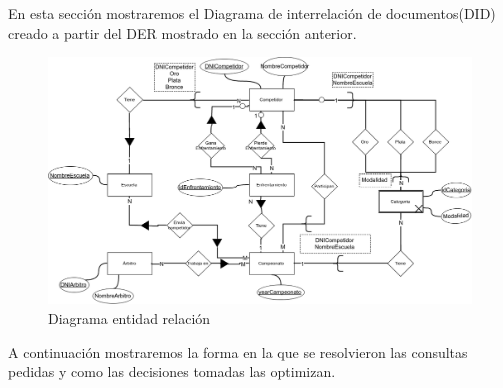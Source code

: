 En esta sección mostraremos el Diagrama de interrelación de documentos(DID) creado a partir del DER mostrado en la sección
anterior.

\begin{figure}[H]
  \centering
    \includegraphics[scale=0.4]{imagenes/DID.png}
  \caption{Diagrama entidad relación}
\end{figure}

A continuación mostraremos la forma en la que se resolvieron las consultas pedidas y como las decisiones tomadas las
optimizan.

